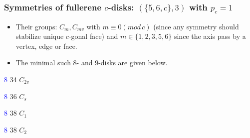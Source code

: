 \documentclass{beamer}
\begin{document}
\begin{frame}\frametitle{Symmetries of fullerene $c$-disks: 
$(\{5,6,c\},3)$ with  $p_c=1$}
\vspace{-3mm}
\begin{itemize}
\item Their groups:  $C_{m},C_{mv}$ with $m\equiv 0(mod\,c)$ (since any 
symmetry should 
stabilize unique $c$-gonal face) and $m\in \{1,2,3,5,6\}$ 
since the axis pass by a vertex, edge or face.
\item The minimal such 
$8$- and $9$-disks are given below.  
\end{itemize}
\begin{center}
\begin{minipage}[b]{24mm}\centering
{}\par
\textcolor{blue}{$8$} 34 $C_{2v}$
\end{minipage}
\begin{minipage}[b]{24mm}
\centering  
{}\par
\textcolor{blue}{$8$} 36 $C_s$
\end{minipage}
\begin{minipage}[b]{24mm}
\centering
{}\par
\textcolor{blue}{$8$} 38 $C_{1}$
\end{minipage}
\begin{minipage}[b]{24mm}
\centering    
{}\par
\textcolor{blue}{$8$} 38 $C_{2}$
\end{minipage}
\end{center}
\vspace{-2mm} 


\end{frame}
\end{document}
